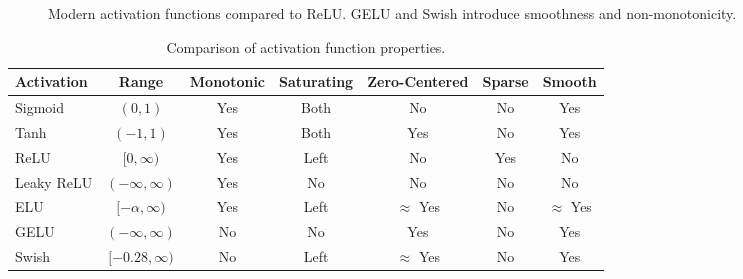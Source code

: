\begin{figure}[h]
    \centering
    \caption{Modern activation functions compared to ReLU. GELU and Swish introduce smoothness and non-monotonicity.}
    \label{fig:modern_activations}
\end{figure}

\begin{table}[h]
    \centering
    \small
    \caption{Comparison of activation function properties.}
    \begin{tabular}{@{}lcccccc@{}}
        \toprule
        \textbf{Activation} & \textbf{Range} & \textbf{Monotonic} & \textbf{Saturating} & \textbf{Zero-Centered} & \textbf{Sparse} & \textbf{Smooth} \\
        \midrule
        Sigmoid & $(0,1)$ & Yes & Both & No & No & Yes \\
        Tanh & $(-1,1)$ & Yes & Both & Yes & No & Yes \\
        ReLU & $[0,\infty)$ & Yes & Left & No & Yes & No \\
        Leaky ReLU & $(-\infty,\infty)$ & Yes & No & No & No & No \\
        ELU & $[-\alpha,\infty)$ & Yes & Left & $\approx$ Yes & No & $\approx$ Yes \\
        GELU & $(-\infty,\infty)$ & No & No & Yes & No & Yes \\
        Swish & $[-0.28,\infty)$ & No & Left & $\approx$ Yes & No & Yes \\
        \bottomrule
    \end{tabular}
\end{table}